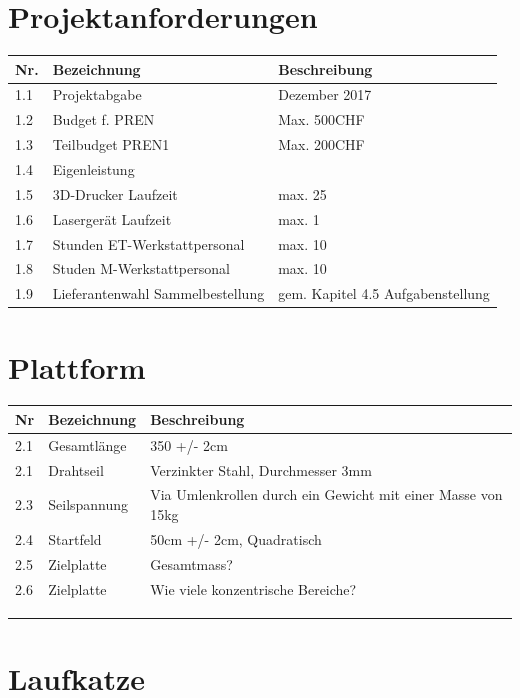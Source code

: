 \documentclass[a4paper]{report}
\begin{document}
\section{Projektanforderungen}
\begin{tabular}{|l|l|l|}
	\hline 
	Nr. & Bezeichnung & Beschreibung \\ 
	\hline 
	1.1 & Projektabgabe & Dezember 2017 \\ 
	\hline 
	1.2 & Budget f. PREN & Max. 500CHF \\ 
	\hline 
	1.3 & Teilbudget PREN1 & Max. 200CHF \\ 
	\hline 
	1.4 & Eigenleistung &  \\ 
	\hline 
	1.5 & 3D-Drucker Laufzeit & max. 25 \\ 
	\hline 
	1.6 & Lasergerät Laufzeit & max. 1 \\ 
	\hline 
	1.7 & Stunden ET-Werkstattpersonal & max. 10 \\ 
	\hline 
	1.8 & Studen M-Werkstattpersonal & max. 10 \\ 
	\hline 
	1.9 & Lieferantenwahl Sammelbestellung & gem. Kapitel 4.5 Aufgabenstellung \\ 
	\hline 
	 
\end{tabular} 

\section{Plattform}
\begin{tabular}{|l|l|l|}
	\hline 
	Nr & Bezeichnung & Beschreibung \\ 
	\hline 
	2.1 & Gesamtlänge & 350 +/- 2cm \\ 
	\hline 
	2.1 & Drahtseil & Verzinkter Stahl, Durchmesser 3mm \\ 
	\hline 
	2.3 & Seilspannung & Via Umlenkrollen durch ein Gewicht mit einer Masse von 15kg \\ 
	\hline 
	2.4 & Startfeld & 50cm +/- 2cm, Quadratisch \\ 
	\hline 
	2.5 & Zielplatte & Gesamtmass? \\ 
	\hline 
	2.6 & Zielplatte & Wie viele konzentrische Bereiche? \\ 
	\hline 
	&  &  \\ 
	\hline 
	&  &  \\ 
	\hline 
	&  &  \\ 
	\hline 
\end{tabular} 
\section{Laufkatze}


\newpage

\printbibliography
\end{document}
